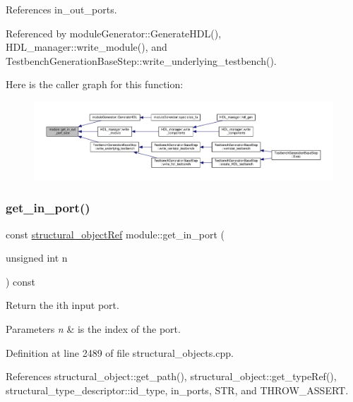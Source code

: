 References in\+\_\+out\+\_\+ports.



Referenced by module\+Generator\+::\+Generate\+H\+D\+L(), H\+D\+L\+\_\+manager\+::write\+\_\+module(), and Testbench\+Generation\+Base\+Step\+::write\+\_\+underlying\+\_\+testbench().

Here is the caller graph for this function\+:
\nopagebreak
\begin{figure}[H]
\begin{center}
\leavevmode
\includegraphics[width=350pt]{d0/dd3/classmodule_ad33fb298d79ed9faf5531a41b5f8e647_icgraph}
\end{center}
\end{figure}
\mbox{\label{classmodule_a0e39b683ccf93e8a47bb227430ed3233}} 
\subsubsection{\texorpdfstring{get\+\_\+in\+\_\+port()}{get\_in\_port()}}
{\footnotesize\ttfamily const \hyperlink{structural__objects_8hpp_a8ea5f8cc50ab8f4c31e2751074ff60b2}{structural\+\_\+object\+Ref} module\+::get\+\_\+in\+\_\+port (\begin{DoxyParamCaption}\item[{unsigned int}]{n }\end{DoxyParamCaption}) const}



Return the ith input port. 


\begin{DoxyParams}{Parameters}
{\em n} & is the index of the port. \\
\hline
\end{DoxyParams}


Definition at line 2489 of file structural\+\_\+objects.\+cpp.



References structural\+\_\+object\+::get\+\_\+path(), structural\+\_\+object\+::get\+\_\+type\+Ref(), structural\+\_\+type\+\_\+descriptor\+::id\+\_\+type, in\+\_\+ports, S\+TR, and T\+H\+R\+O\+W\+\_\+\+A\+S\+S\+E\+RT.



